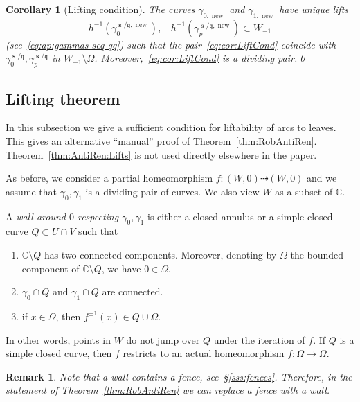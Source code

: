 \documentclass[]{amsart}
\renewcommand{\sp}{{\ \ }}
\newcommand\seq{{\operatorname{\mathbf s}}}
\renewcommand{\qq}{\mathfrak{q}}
\newcommand\wall{{Q}}
\newcommand\inn{{\Omega}}
\newcommand\new{{\operatorname{new}}}
\newcommand{\C}{\mathbb{C}}
\newtheorem{cor}[thm]{Corollary}
\newtheorem{rem}[thm]{Remark}
\theoremstyle{remark}
\numberwithin{equation}{section}
\theoremstyle{definition}
\begin{document}
\begin{cor}[Lifting condition]
\label{cor:LiftCond}
The curves $\gamma_{0,\new}$ and $\gamma_{1,\new}$ have unique lifts
\begin{equation}
\label{eq:cor:LiftCond}
h^{-1}\left(\gamma_0^{\seq/\qq,\new}\right),\sp\sp h^{-1}\left(\gamma_p^{\seq/\qq,\new}\right)\subset W_{-1}
\end{equation}
(see~\eqref{eq:ap:gammas seq qq}) such that the pair~\eqref{eq:cor:LiftCond} coincide with $\gamma_0^{\seq/\qq}, \gamma_p^{\seq/\qq}$ in $W_{-1}\setminus \inn$. Moreover,~\eqref{eq:cor:LiftCond} is a dividing pair.\qed
\end{cor}





\subsection{Lifting theorem}
\label{ss:ap:LiftThm}
In this subsection we give a sufficient condition for liftability of arcs to leaves. This gives an alternative ``manual'' proof of Theorem~\ref{thm:RobAntiRen}. Theorem~\ref{thm:AntiRen:Lifts} is not used directly elsewhere in the paper.

As before, we consider a partial homeomorphism $f\colon (W,0)\dashrightarrow (W,0)$ and we assume that $\gamma_0,\gamma_1$ is a dividing pair of curves. We also view $W$ as a subset of $\C$. 

A \emph{wall around $0$ respecting $\gamma_0,\gamma_1$} is either a closed annulus or a simple closed curve $\wall\subset U\cap V$ such that
\begin{enumerate}
\item $\C\setminus \wall$ has two connected components. Moreover, denoting by $\inn$ the bounded component of $\C\setminus \wall$, we have $0\in \inn$.
\item $\gamma_0\cap \wall$ and $\gamma_1\cap \wall$ are connected.
\item if $x\in \inn$, then $f^{\pm 1}(x)\in \wall\cup \inn$.
\end{enumerate}
In other words, points in $W$ do not jump over $\wall$ under the iteration of $f$. If $\wall$ is a simple closed curve, then $f$ restricts to an actual homeomorphism $f\colon \inn\to \inn$. 



\begin{rem}
\label{rem:wall has a fence}
Note that a wall contains a fence, see~\S\ref{sss:fences}. Therefore, in the statement of Theorem~\ref{thm:RobAntiRen} we can replace a fence with a wall.
\end{rem}
\end{document}
